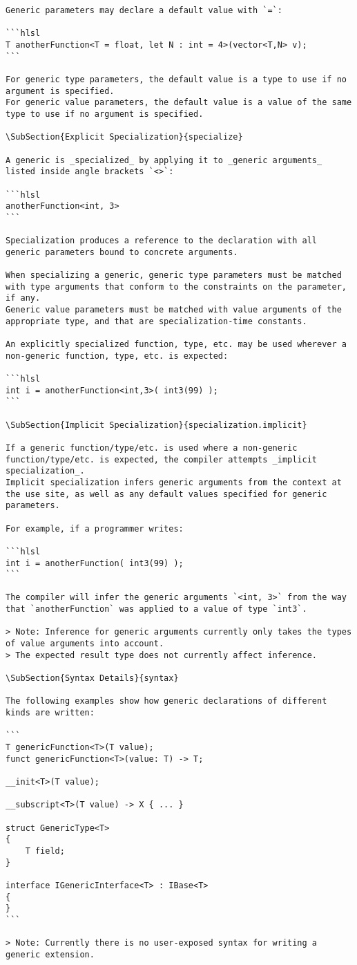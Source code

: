 \begin{verbatim}
Generic parameters may declare a default value with `=`:

```hlsl
T anotherFunction<T = float, let N : int = 4>(vector<T,N> v);
```

For generic type parameters, the default value is a type to use if no argument is specified.
For generic value parameters, the default value is a value of the same type to use if no argument is specified.

\SubSection{Explicit Specialization}{specialize}

A generic is _specialized_ by applying it to _generic arguments_ listed inside angle brackets `<>`:

```hlsl
anotherFunction<int, 3>
```

Specialization produces a reference to the declaration with all generic parameters bound to concrete arguments.

When specializing a generic, generic type parameters must be matched with type arguments that conform to the constraints on the parameter, if any.
Generic value parameters must be matched with value arguments of the appropriate type, and that are specialization-time constants.

An explicitly specialized function, type, etc. may be used wherever a non-generic function, type, etc. is expected:

```hlsl
int i = anotherFunction<int,3>( int3(99) );
```

\SubSection{Implicit Specialization}{specialization.implicit}

If a generic function/type/etc. is used where a non-generic function/type/etc. is expected, the compiler attempts _implicit specialization_.
Implicit specialization infers generic arguments from the context at the use site, as well as any default values specified for generic parameters.

For example, if a programmer writes:

```hlsl
int i = anotherFunction( int3(99) );
```

The compiler will infer the generic arguments `<int, 3>` from the way that `anotherFunction` was applied to a value of type `int3`.

> Note: Inference for generic arguments currently only takes the types of value arguments into account.
> The expected result type does not currently affect inference.

\SubSection{Syntax Details}{syntax}

The following examples show how generic declarations of different kinds are written:

```
T genericFunction<T>(T value);
funct genericFunction<T>(value: T) -> T;

__init<T>(T value);

__subscript<T>(T value) -> X { ... }

struct GenericType<T>
{
    T field;
}

interface IGenericInterface<T> : IBase<T>
{
}
```

> Note: Currently there is no user-exposed syntax for writing a generic extension.

\end{verbatim}

